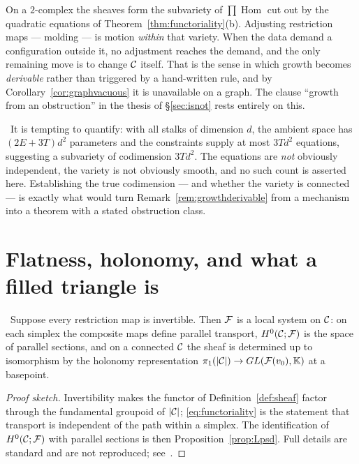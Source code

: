 \begin{remark}
\label{rem:growthderivable}
On a $2$-complex the sheaves form the subvariety of
$\prod\operatorname{Hom}$ cut out by the quadratic equations of
Theorem~\ref{thm:functoriality}(b). Adjusting restriction maps --- molding ---
is motion \emph{within} that variety. When the data demand a configuration
outside it, no adjustment reaches the demand, and the only remaining move is
to change $\mathcal{C}$ itself. That is the sense in which growth becomes
\emph{derivable} rather than triggered by a hand-written rule, and by
Corollary~\ref{cor:graphvacuous} it is unavailable on a graph. The clause
``growth from an obstruction'' in the thesis of \S\ref{sec:isnot} rests
entirely on this.
\end{remark}

\begin{hon}\Hon
\Proposed\ It is tempting to quantify: with all stalks of dimension $d$, the
ambient space has $(2E+3T)d^2$ parameters and the constraints supply at most
$3Td^2$ equations, suggesting a subvariety of codimension $3Td^2$. The
equations are \emph{not} obviously independent, the variety is not obviously
smooth, and no such count is asserted here. Establishing the true codimension
--- and whether the variety is connected --- is exactly what would turn
Remark~\ref{rem:growthderivable} from a mechanism into a theorem with a
stated obstruction class.
\end{hon}

\section{Flatness, holonomy, and what a filled triangle is}
\label{sec:flatness}

\begin{proposition}\label{prop:localsystem}
\ProvedCond\ Suppose every restriction map is invertible. Then $\mathcal{F}$ is a
local system on $\mathcal{C}$: on each simplex the composite maps define parallel
transport, $H^{0}(\mathcal{C};\mathcal{F})$ is the space of parallel sections, and on a connected
$\mathcal{C}$ the sheaf is determined up to isomorphism by the holonomy
representation $\pi_1(|\mathcal{C}|)\to GL(\mathcal{F}(v_0),\mathbb{K})$ at a basepoint.
\end{proposition}
\begin{proof}[Proof sketch]
Invertibility makes the functor of Definition~\ref{def:sheaf} factor through
the fundamental groupoid of $|\mathcal{C}|$; \eqref{eq:functoriality} is the statement
that transport is independent of the path within a simplex. The identification
of $H^{0}(\mathcal{C};\mathcal{F})$ with parallel sections is then
Proposition~\ref{prop:Lpsd}. Full details are standard and are not reproduced;
see~\cite{Curry}.
\end{proof}


